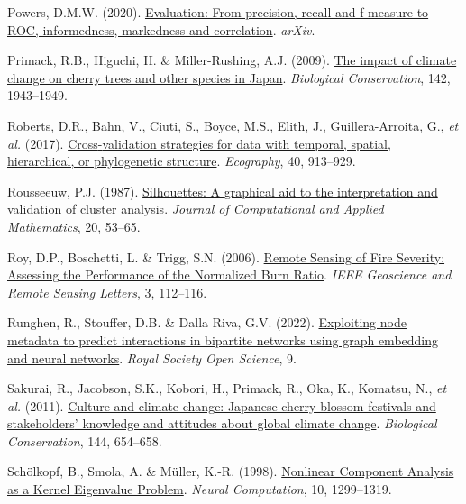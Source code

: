 \documentclass[
  letterpaper,
]{scrbook}
\newlength{\cslhangindent}
\newenvironment{CSLReferences}[2] %
 {\begin{list}{}{%
  \setlength{\itemindent}{0pt}
  \setlength{\leftmargin}{0pt}
  \setlength{\parsep}{0pt}
  \ifodd #1
   \setlength{\leftmargin}{\cslhangindent}
   \setlength{\itemindent}{-1\cslhangindent}
  \fi
  \setlength{\itemsep}{#2\baselineskip}}}
 {\end{list}}
\begin{document}
\begin{CSLReferences}{1}{0}
Powers, D.M.W. (2020).
\href{https://doi.org/10.48550/ARXIV.2010.16061}{Evaluation: From
precision, recall and f-measure to ROC, informedness, markedness and
correlation}. \emph{arXiv}.

Primack, R.B., Higuchi, H. \& Miller-Rushing, A.J. (2009).
\href{https://doi.org/10.1016/j.biocon.2009.03.016}{The impact of
climate change on cherry trees and other species in Japan}.
\emph{Biological Conservation}, 142, 1943--1949.

Roberts, D.R., Bahn, V., Ciuti, S., Boyce, M.S., Elith, J.,
Guillera-Arroita, G., \emph{et al.} (2017).
\href{https://doi.org/10.1111/ecog.02881}{Cross{-}validation strategies
for data with temporal, spatial, hierarchical, or phylogenetic
structure}. \emph{Ecography}, 40, 913--929.

Rousseeuw, P.J. (1987).
\href{https://doi.org/10.1016/0377-0427(87)90125-7}{Silhouettes: A
graphical aid to the interpretation and validation of cluster analysis}.
\emph{Journal of Computational and Applied Mathematics}, 20, 53--65.

Roy, D.P., Boschetti, L. \& Trigg, S.N. (2006).
\href{https://doi.org/10.1109/lgrs.2005.858485}{Remote Sensing of Fire
Severity: Assessing the Performance of the Normalized Burn Ratio}.
\emph{IEEE Geoscience and Remote Sensing Letters}, 3, 112--116.

Runghen, R., Stouffer, D.B. \& Dalla Riva, G.V. (2022).
\href{https://doi.org/10.1098/rsos.220079}{Exploiting node metadata to
predict interactions in bipartite networks using graph embedding and
neural networks}. \emph{Royal Society Open Science}, 9.

Sakurai, R., Jacobson, S.K., Kobori, H., Primack, R., Oka, K., Komatsu,
N., \emph{et al.} (2011).
\href{https://doi.org/10.1016/j.biocon.2010.09.028}{Culture and climate
change: Japanese cherry blossom festivals and stakeholders{'} knowledge
and attitudes about global climate change}. \emph{Biological
Conservation}, 144, 654--658.

Schölkopf, B., Smola, A. \& Müller, K.-R. (1998).
\href{https://doi.org/10.1162/089976698300017467}{Nonlinear Component
Analysis as a Kernel Eigenvalue Problem}. \emph{Neural Computation}, 10,
1299--1319.


\end{CSLReferences}
\end{document}
